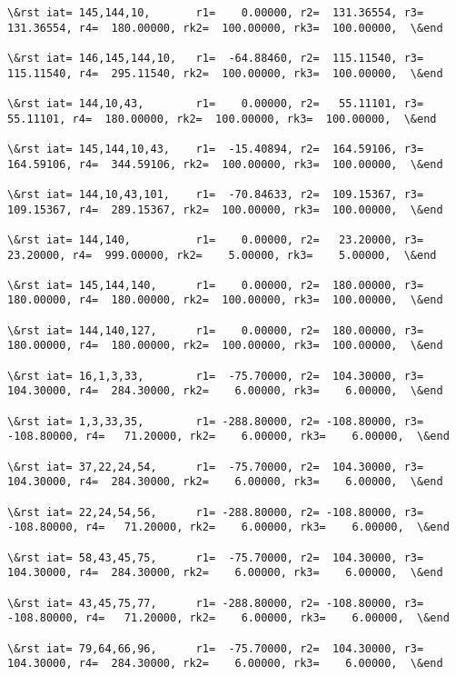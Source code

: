 \documentclass[11pt]{article}
\begin{document}
\begin{Verbatim}[commandchars=\\\{\}]
\&rst iat= 145,144,10,       r1=    0.00000, r2=  131.36554, r3=  131.36554, r4=  180.00000, rk2=  100.00000, rk3=  100.00000,  \&end

\&rst iat= 146,145,144,10,   r1=  -64.88460, r2=  115.11540, r3=  115.11540, r4=  295.11540, rk2=  100.00000, rk3=  100.00000,  \&end

\&rst iat= 144,10,43,        r1=    0.00000, r2=   55.11101, r3=   55.11101, r4=  180.00000, rk2=  100.00000, rk3=  100.00000,  \&end

\&rst iat= 145,144,10,43,    r1=  -15.40894, r2=  164.59106, r3=  164.59106, r4=  344.59106, rk2=  100.00000, rk3=  100.00000,  \&end

\&rst iat= 144,10,43,101,    r1=  -70.84633, r2=  109.15367, r3=  109.15367, r4=  289.15367, rk2=  100.00000, rk3=  100.00000,  \&end

\&rst iat= 144,140,          r1=    0.00000, r2=   23.20000, r3=   23.20000, r4=  999.00000, rk2=    5.00000, rk3=    5.00000,  \&end

\&rst iat= 145,144,140,      r1=    0.00000, r2=  180.00000, r3=  180.00000, r4=  180.00000, rk2=  100.00000, rk3=  100.00000,  \&end

\&rst iat= 144,140,127,      r1=    0.00000, r2=  180.00000, r3=  180.00000, r4=  180.00000, rk2=  100.00000, rk3=  100.00000,  \&end

\&rst iat= 16,1,3,33,        r1=  -75.70000, r2=  104.30000, r3=  104.30000, r4=  284.30000, rk2=    6.00000, rk3=    6.00000,  \&end

\&rst iat= 1,3,33,35,        r1= -288.80000, r2= -108.80000, r3= -108.80000, r4=   71.20000, rk2=    6.00000, rk3=    6.00000,  \&end

\&rst iat= 37,22,24,54,      r1=  -75.70000, r2=  104.30000, r3=  104.30000, r4=  284.30000, rk2=    6.00000, rk3=    6.00000,  \&end

\&rst iat= 22,24,54,56,      r1= -288.80000, r2= -108.80000, r3= -108.80000, r4=   71.20000, rk2=    6.00000, rk3=    6.00000,  \&end

\&rst iat= 58,43,45,75,      r1=  -75.70000, r2=  104.30000, r3=  104.30000, r4=  284.30000, rk2=    6.00000, rk3=    6.00000,  \&end

\&rst iat= 43,45,75,77,      r1= -288.80000, r2= -108.80000, r3= -108.80000, r4=   71.20000, rk2=    6.00000, rk3=    6.00000,  \&end

\&rst iat= 79,64,66,96,      r1=  -75.70000, r2=  104.30000, r3=  104.30000, r4=  284.30000, rk2=    6.00000, rk3=    6.00000,  \&end


\end{Verbatim}
\end{document}

